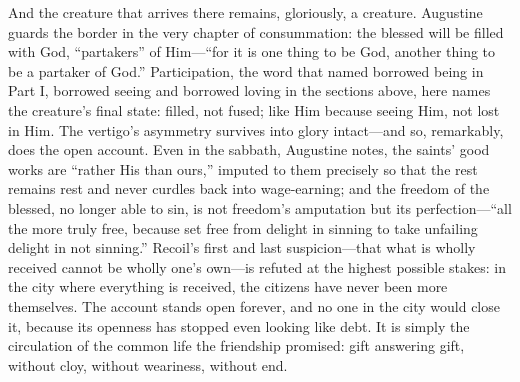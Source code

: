 And the creature that arrives there remains, gloriously, a creature. Augustine guards the border in the very chapter of consummation: the blessed will be filled with God, ``partakers'' of Him---``for it is one thing to be God, another thing to be a partaker of God.'' Participation, the word that named borrowed being in Part I, borrowed seeing and borrowed loving in the sections above, here names the creature's final state: filled, not fused; like Him because seeing Him, not lost in Him. The vertigo's asymmetry survives into glory intact---and so, remarkably, does the open account. Even in the sabbath, Augustine notes, the saints' good works are ``rather His than ours,'' imputed to them precisely so that the rest remains rest and never curdles back into wage-earning; and the freedom of the blessed, no longer able to sin, is not freedom's amputation but its perfection---``all the more truly free, because set free from delight in sinning to take unfailing delight in not sinning.'' Recoil's first and last suspicion---that what is wholly received cannot be wholly one's own---is refuted at the highest possible stakes: in the city where everything is received, the citizens have never been more themselves. The account stands open forever, and no one in the city would close it, because its openness has stopped even looking like debt. It is simply the circulation of the common life the friendship promised: gift answering gift, without cloy, without weariness, without end.

